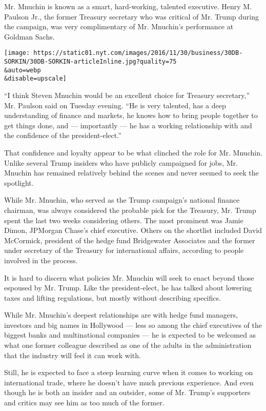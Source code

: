 Mr. Mnuchin is known as a smart, hard-working, talented executive. Henry
M. Paulson Jr., the former Treasury secretary who was critical of Mr.
Trump during the campaign, was very complimentary of Mr. Mnuchin's
performance at Goldman Sachs.

\texttt{[image: https://static01.nyt.com/images/2016/11/30/business/30DB-SORKIN/30DB-SORKIN-articleInline.jpg?quality=75\\\&auto=webp\\\&disable=upscale]}

``I think Steven Mnuchin would be an excellent choice for Treasury
secretary,'' Mr. Paulson said on Tuesday evening. ``He is very talented,
has a deep understanding of finance and markets, he knows how to bring
people together to get things done, and --- importantly --- he has a
working relationship with and the confidence of the president-elect.''

That confidence and loyalty appear to be what clinched the role for Mr.
Mnuchin. Unlike several Trump insiders who have publicly campaigned for
jobs, Mr. Mnuchin has remained relatively behind the scenes and never
seemed to seek the spotlight.

While Mr. Mnuchin, who served as the Trump campaign's national finance
chairman, was always considered the probable pick for the Treasury, Mr.
Trump spent the last two weeks considering others. The most prominent
was Jamie Dimon, JPMorgan Chase's chief executive. Others on the
shortlist included David McCormick, president of the hedge fund
Bridgewater Associates and the former under secretary of the Treasury
for international affairs, according to people involved in the process.

It is hard to discern what policies Mr. Mnuchin will seek to enact
beyond those espoused by Mr. Trump. Like the president-elect, he has
talked about lowering taxes and lifting regulations, but mostly without
describing specifics.

While Mr. Mnuchin's deepest relationships are with hedge fund managers,
investors and big names in Hollywood --- less so among the chief
executives of the biggest banks and multinational companies --- he is
expected to be welcomed as what one former colleague described as one of
the adults in the administration that the industry will feel it can work
with.

Still, he is expected to face a steep learning curve when it comes to
working on international trade, where he doesn't have much previous
experience. And even though he is both an insider and an outsider, some
of Mr. Trump's supporters and critics may see him as too much of the
former.


